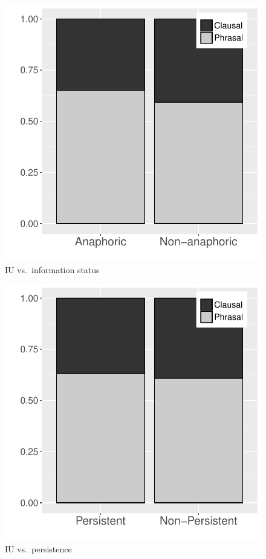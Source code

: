 \begin{figure}
	\begin{center}
	\includegraphics[width=.5\textwidth]{figure/IUInfoStatus.pdf}
	\caption{IU vs.~information status}
	\label{IUInfoStatusF}
	\end{center}
\end{figure}
\begin{figure}
	\begin{center}
	\includegraphics[width=.5\textwidth]{figure/IUPer.pdf}
	\caption{IU vs.~persistence}
	\label{IUPerF}
	\end{center}
\end{figure}



